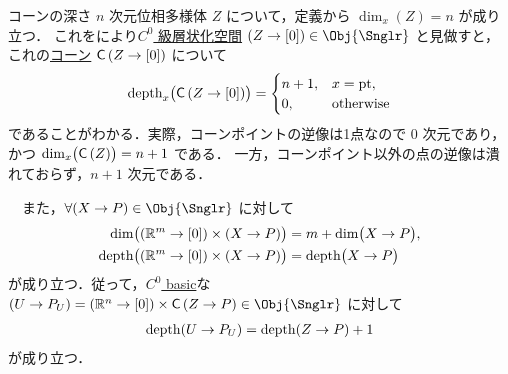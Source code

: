 \documentclass[TQFT_main]{subfiles}
\begin{document}
\begin{myexample}[label=ex:depth-Cone]{コーンの深さ}
    $n$ 次元位相多様体 $Z$ について，定義から $\dim_x(Z) = n$ が成り立つ．
    これをにより\hyperref[def:Snglr-C0]{$C^0$ 級層状化空間} $(Z \to [0]) \in \Obj{\Snglr}$ と見做すと，これの\hyperref[def:str-cone]{コーン} $\mathsf{C}\left( Z \to [0] \right)$ について
    \begin{align}
        \operatorname{depth}_x \bigl( \mathsf{C}\left( Z \to [0] \right) \bigr) 
        =
        \begin{cases}
            n+1, &x = \mathrm{pt}, \\
            0, &\text{otherwise}
        \end{cases}
    \end{align}
    であることがわかる．実際，コーンポイントの逆像は1点なので $0$ 次元であり，かつ $\dim_x \bigl( \mathsf{C}\left( Z \right) \bigr) = n+1$ である．
    一方，コーンポイント以外の点の逆像は潰れておらず，$n+1$ 次元である．

    　また，$\forall (X \to P) \in \Obj{\Snglr}$ に対して
    \begin{align}
        \dim \bigl( (\mathbb{R}^m \to [0]) \times (X \to P) \bigr) &= m + \dim \bigl( X \to P \bigr), \\
        \operatorname{depth} \bigl( (\mathbb{R}^m \to [0]) \times (X \to P) \bigr) &= \operatorname{depth} \bigl( X \to P \bigr) 
    \end{align}
    が成り立つ．従って，\hyperref[def:C0-basic]{$C^0$ basic}な $(U \to P_U) = (\mathbb{R}^n \to [0]) \times \Cone{Z \to P} \in \Obj{\Snglr}$ に対して
    \begin{align}
        \operatorname{depth} (U \to P_U) = \operatorname{depth} (Z \to P) + 1
    \end{align}
    が成り立つ．
\end{myexample}
\end{document}
